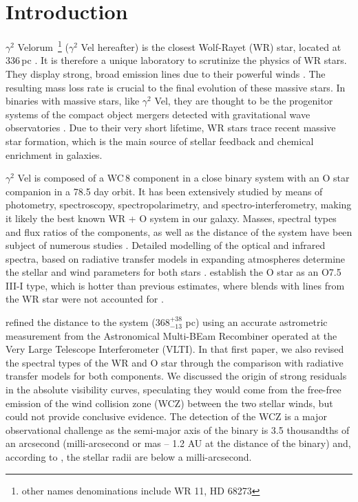 \documentclass[usenatbib]{mnras}%
\begin{document}
\section{Introduction}

$\gamma^2$ Velorum~\footnote{other names denominations include WR 11, HD 68273} ($\gamma^2$ Vel hereafter) is the closest Wolf-Rayet (WR) star, located at 336\,pc \citep[see for instance][]{2007MNRAS.377..415N}. It is therefore a unique laboratory to scrutinize the physics of WR stars. They display strong, broad emission lines due to their powerful winds 
 \citep[see][for a review]{2007ARA&A..45..177C}. The resulting mass loss rate is crucial to the final evolution of these massive stars. In binaries with massive stars, like $\gamma^2$ Vel, they are thought to be the progenitor systems of the compact object mergers detected with gravitational wave observatories \citep{2016ApJ...818L..22A}. Due to their very short lifetime, WR stars trace recent massive star formation, which is the main source of stellar feedback and chemical enrichment in galaxies. 
  
 $\gamma^2$ Vel is composed of a WC\,8 component in a close binary system with an O star companion in a 78.5 day orbit. It has been extensively studied by means of photometry, spectroscopy, spectropolarimetry, and spectro-interferometry, making it likely the best known WR + O system in our galaxy. Masses, spectral types and flux ratios of the components, as well as  the distance of the system have been subject of numerous studies 
 \citep[e.g.][]{1997A&A...328..219S, 1997ApJ...484L.153S, 1997NewA....2..245V,2007MNRAS.377..415N,  2007A&A...464..107M}.  Detailed modelling of the optical and infrared spectra, based on radiative transfer models in expanding atmospheres determine the stellar and wind parameters for both stars \citep{1999A&A...345..163D,2000A&A...358..187D}. \citet{1999A&A...345..163D,2001NewAR..45..135V} establish the O star as an O7.5 III-I type, which is hotter than previous estimates, where blends with lines from the WR star were not accounted for \citep{1971A&A....11...83B,1972ApJ...172..623C,1997ApJ...484L.153S}. 
 
\citet[][hereafter Paper~I]{2007A&A...464..107M} refined the distance to the system ($368^{+38}_{-13}$ pc) using an accurate astrometric measurement  from the Astronomical Multi-BEam Recombiner  \citep[AMBER,][]{Petrov2007} operated at the Very Large Telescope Interferometer (VLTI). In that first paper, we also revised the spectral types of the WR and O star through the comparison with radiative transfer models for both components. We discussed the origin of strong residuals in the absolute visibility curves, speculating they would come from the free-free emission of the wind collision zone (WCZ) between the two stellar winds, but could not provide conclusive evidence. The detection of the WCZ is a major observational challenge as the semi-major axis of the binary is 3.5  thousandths of an arcsecond (milli-arcsecond or mas -- 1.2 AU at the distance of the binary) and, according to   \citet{1970MNRAS.148..103H,2007MNRAS.377..415N,2007A&A...464..107M}, the stellar radii are below a milli-arcsecond.
\end{document}
